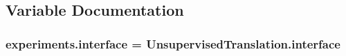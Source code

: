 \subsection{Variable Documentation}
\subsubsection[{\texorpdfstring{interface}{interface}}]{\setlength{\rightskip}{0pt plus 5cm}experiments.\+interface = Unsupervised\+Translation.\+interface}\hypertarget{namespaceexperiments_a13c0f96547027ac51391fa0dd065ca63}{}\label{namespaceexperiments_a13c0f96547027ac51391fa0dd065ca63}
\begin{DoxyVerb}\end{DoxyVerb}
 